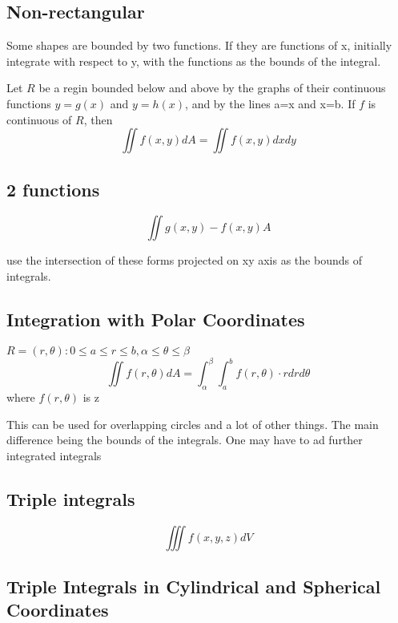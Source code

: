 \subsection{Non-rectangular}
Some shapes are bounded by two functions. If they are functions of x, initially integrate with respect to y, with the functions as the bounds of the integral.


Let $R$ be a regin bounded below and above by the graphs of their continuous functions $y=g(x)$ and $y=h(x)$, and by the lines a=x and x=b. If $f$ is continuous of $R$, then
\begin{equation}
	\label{}
\iint f(x,y)dA=\iint f(x,y)dx dy	
\end{equation}

\subsection{2 functions}

\begin{equation}
	\label{}	
\iint g(x,y)-f(x,y)A
\end{equation}

use the intersection of these forms projected on xy axis as the bounds of integrals.

\subsection{Integration with Polar Coordinates}

$R={(r,\theta) : 0\leq a \leq r \leq b, \alpha \leq\theta\leq\beta}$
\begin{equation}
	\label{}	
\iint f(r,\theta)dA=\int_{\alpha}^{\beta}\int_{a}^{b} f(r,\theta) \cdot r dr d\theta
\end{equation}
where $f(r,\theta)$ is z

This can be used for overlapping circles and a lot of other things. The main difference being the bounds of the integrals. One may have to ad further integrated integrals

\subsection{Triple integrals}

\begin{equation}
	\label{}	
\iiint f(x,y,z)dV
\end{equation}

\subsection{Triple Integrals in Cylindrical and Spherical Coordinates}

